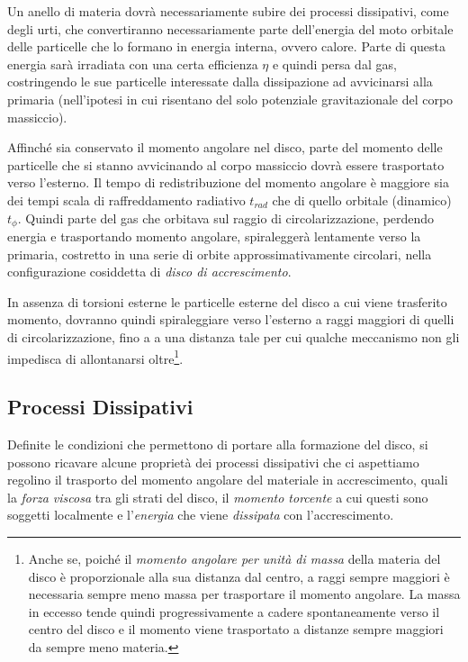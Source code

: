 \documentclass[a4paperbi]{article}
\begin{document}
	Un anello di materia dovrà necessariamente subire dei processi dissipativi, come degli urti, che convertiranno necessariamente parte dell'energia del moto orbitale delle particelle che lo formano in energia interna, ovvero calore. Parte di questa energia sarà irradiata con una certa efficienza $\eta$ e quindi persa dal gas, costringendo le sue particelle interessate dalla dissipazione ad avvicinarsi alla primaria (nell'ipotesi in cui risentano del solo potenziale gravitazionale del corpo massiccio). 
	
	Affinché sia conservato il momento angolare nel disco, parte del momento delle particelle che si stanno avvicinando al corpo massiccio dovrà essere trasportato verso l'esterno. Il tempo di redistribuzione del momento angolare è maggiore sia dei tempi scala di raffreddamento radiativo $t_{rad}$ che di quello orbitale (dinamico) $t_{\phi}$. Quindi parte del gas che orbitava sul raggio di circolarizzazione, perdendo energia e trasportando momento angolare, spiraleggerà lentamente verso la primaria, costretto in una serie di orbite approssimativamente circolari, nella configurazione cosiddetta di \textit{disco di accrescimento}. 	
	
	In assenza di torsioni esterne le particelle esterne del disco a cui viene trasferito momento, dovranno quindi spiraleggiare verso l'esterno a raggi maggiori di quelli di circolarizzazione, fino a a una distanza tale per cui qualche meccanismo non gli impedisca di allontanarsi oltre\footnote{Anche se, poiché il \textit{momento angolare per unità di massa} della materia del disco è proporzionale alla sua distanza dal centro, a raggi sempre maggiori è necessaria sempre meno massa per trasportare il momento angolare. La massa in eccesso tende quindi progressivamente a cadere spontaneamente verso il centro del disco e il momento viene trasportato a distanze sempre maggiori da sempre meno materia.}.
		
\subsection{Processi Dissipativi}

	Definite le condizioni che permettono di portare alla formazione del disco, si possono ricavare alcune proprietà dei processi dissipativi che ci aspettiamo regolino il trasporto del momento angolare del materiale in accrescimento, quali la \textit{forza viscosa} tra gli strati del disco, il \textit{momento torcente} a cui questi sono soggetti localmente e l'\textit{energia} che viene \textit{dissipata} con l'accrescimento.
	
\end{document}

